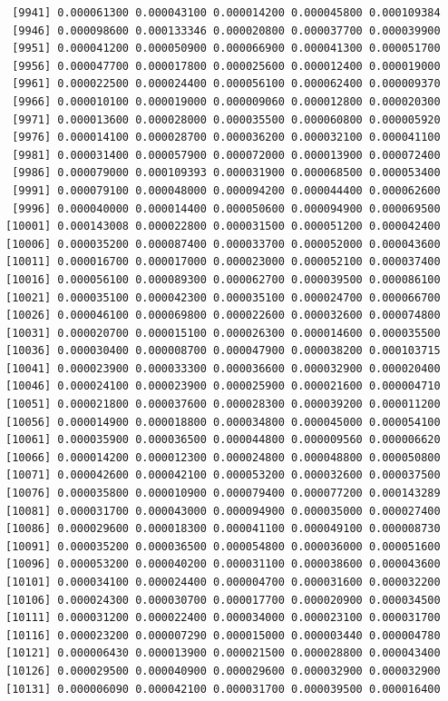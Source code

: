 \documentclass[]{article}
\begin{document}
\begin{verbatim}
 [9941] 0.000061300 0.000043100 0.000014200 0.000045800 0.000109384
 [9946] 0.000098600 0.000133346 0.000020800 0.000037700 0.000039900
 [9951] 0.000041200 0.000050900 0.000066900 0.000041300 0.000051700
 [9956] 0.000047700 0.000017800 0.000025600 0.000012400 0.000019000
 [9961] 0.000022500 0.000024400 0.000056100 0.000062400 0.000009370
 [9966] 0.000010100 0.000019000 0.000009060 0.000012800 0.000020300
 [9971] 0.000013600 0.000028000 0.000035500 0.000060800 0.000005920
 [9976] 0.000014100 0.000028700 0.000036200 0.000032100 0.000041100
 [9981] 0.000031400 0.000057900 0.000072000 0.000013900 0.000072400
 [9986] 0.000079000 0.000109393 0.000031900 0.000068500 0.000053400
 [9991] 0.000079100 0.000048000 0.000094200 0.000044400 0.000062600
 [9996] 0.000040000 0.000014400 0.000050600 0.000094900 0.000069500
[10001] 0.000143008 0.000022800 0.000031500 0.000051200 0.000042400
[10006] 0.000035200 0.000087400 0.000033700 0.000052000 0.000043600
[10011] 0.000016700 0.000017000 0.000023000 0.000052100 0.000037400
[10016] 0.000056100 0.000089300 0.000062700 0.000039500 0.000086100
[10021] 0.000035100 0.000042300 0.000035100 0.000024700 0.000066700
[10026] 0.000046100 0.000069800 0.000022600 0.000032600 0.000074800
[10031] 0.000020700 0.000015100 0.000026300 0.000014600 0.000035500
[10036] 0.000030400 0.000008700 0.000047900 0.000038200 0.000103715
[10041] 0.000023900 0.000033300 0.000036600 0.000032900 0.000020400
[10046] 0.000024100 0.000023900 0.000025900 0.000021600 0.000004710
[10051] 0.000021800 0.000037600 0.000028300 0.000039200 0.000011200
[10056] 0.000014900 0.000018800 0.000034800 0.000045000 0.000054100
[10061] 0.000035900 0.000036500 0.000044800 0.000009560 0.000006620
[10066] 0.000014200 0.000012300 0.000024800 0.000048800 0.000050800
[10071] 0.000042600 0.000042100 0.000053200 0.000032600 0.000037500
[10076] 0.000035800 0.000010900 0.000079400 0.000077200 0.000143289
[10081] 0.000031700 0.000043000 0.000094900 0.000035000 0.000027400
[10086] 0.000029600 0.000018300 0.000041100 0.000049100 0.000008730
[10091] 0.000035200 0.000036500 0.000054800 0.000036000 0.000051600
[10096] 0.000053200 0.000040200 0.000031100 0.000038600 0.000043600
[10101] 0.000034100 0.000024400 0.000004700 0.000031600 0.000032200
[10106] 0.000024300 0.000030700 0.000017700 0.000020900 0.000034500
[10111] 0.000031200 0.000022400 0.000034000 0.000023100 0.000031700
[10116] 0.000023200 0.000007290 0.000015000 0.000003440 0.000004780
[10121] 0.000006430 0.000013900 0.000021500 0.000028800 0.000043400
[10126] 0.000029500 0.000040900 0.000029600 0.000032900 0.000032900
[10131] 0.000006090 0.000042100 0.000031700 0.000039500 0.000016400

\end{verbatim}
\end{document}
